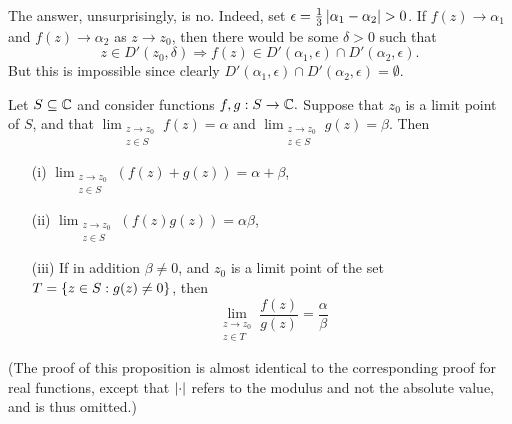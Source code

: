 \begin{answer}
The answer, unsurprisingly, is no.  Indeed, set $\epsilon = \frac{1}{3} \abs{\alpha_1-\alpha_2}>0$.  If $f(z) \to \alpha_1$ and $f(z) \to \alpha_2$ as $z \to z_0$, then there would be some $\delta >0$ such that
\[
z \in D'(z_0,\delta) \Longrightarrow f(z) \in D'(\alpha_1 , \epsilon ) \cap D'(\alpha_2 , \epsilon).
\]
But this is impossible since clearly $D'(\alpha_1,\epsilon) \cap D'(\alpha_2 , \epsilon) = \emptyset$.
\end{answer} 
 
 
 


\begin{proposition} 
\label{p:alglimits}
Let $S\subseteq \mathbb{C}$ and consider functions $f,g:S \to \mathbb{C}.$  Suppose that $z_0$ is a limit point of $S$, and that $\displaystyle \lim_{\substack{z \to z_0 \\ z \in S}} f(z) = \alpha$ and $\displaystyle \lim_{\substack{z \to z_0 \\ z \in S}} g(z)= \beta$.  Then
\begin{enumerate}
\item[(i)] $\displaystyle \lim_{\substack{z \to z_0 \\ z \in S}} \left( f(z) + g(z) \right) = \alpha + \beta$,
\item[(ii)] $\displaystyle \lim_{\substack{z \to z_0 \\ z \in S}} \left( f(z)g(z) \right) = \alpha  \beta$,
\item[(iii)] If in addition $\beta \neq 0$, and $z_0$ is a limit point of the set $T=\left\{ z \in S: g(z) \neq 0 \right\}$, then
\[
\lim_{ \substack{z \to z_0 \\ z \in T}} \frac{f(z)}{g(z)} = \frac{\alpha}{\beta}
\]
\end{enumerate}
\end{proposition}
(The proof of this proposition is almost identical to the corresponding proof for real functions, except that $\left| \cdot \right|$ refers to the modulus and not the absolute value, and is thus omitted.)




